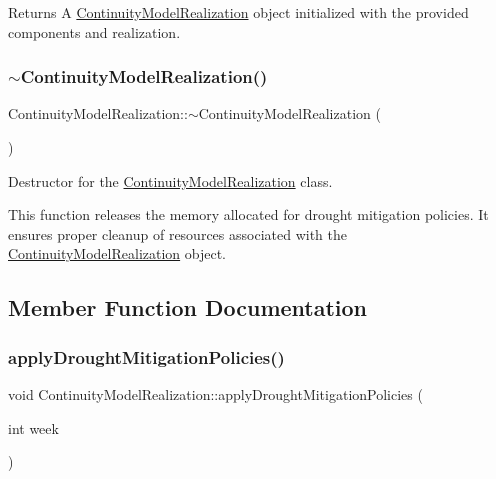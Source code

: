 \begin{DoxyReturn}{Returns}
A {\ttfamily \mbox{\hyperlink{classContinuityModelRealization}{Continuity\+Model\+Realization}}} object initialized with the provided components and realization. 
\end{DoxyReturn}
\mbox{\label{classContinuityModelRealization_afd53069e2f9ab96210ff153d16f01269}} 
\subsubsection{\texorpdfstring{$\sim$\+Continuity\+Model\+Realization()}{~ContinuityModelRealization()}}
{\footnotesize\ttfamily Continuity\+Model\+Realization\+::$\sim$\+Continuity\+Model\+Realization (\begin{DoxyParamCaption}{ }\end{DoxyParamCaption})\hspace{0.3cm}{\ttfamily [override]}}



Destructor for the \mbox{\hyperlink{classContinuityModelRealization}{Continuity\+Model\+Realization}} class. 

This function releases the memory allocated for drought mitigation policies. It ensures proper cleanup of resources associated with the {\ttfamily \mbox{\hyperlink{classContinuityModelRealization}{Continuity\+Model\+Realization}}} object. 

\subsection{Member Function Documentation}
\mbox{\label{classContinuityModelRealization_a1841f4ca49c150cf5d790f6d42496575}} 
\subsubsection{\texorpdfstring{apply\+Drought\+Mitigation\+Policies()}{applyDroughtMitigationPolicies()}}
{\footnotesize\ttfamily void Continuity\+Model\+Realization\+::apply\+Drought\+Mitigation\+Policies (\begin{DoxyParamCaption}\item[{int}]{week }\end{DoxyParamCaption})}



